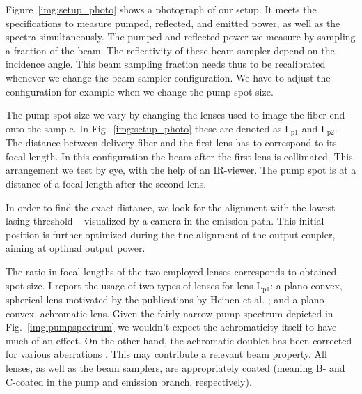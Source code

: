 Figure~\ref{img:setup_photo} shows a photograph of our setup.
It meets the specifications
to measure pumped,
reflected, and
emitted power,
as well as the spectra
simultaneously.
The pumped and reflected power
we measure by sampling
a fraction of the beam.
The reflectivity of these beam sampler
depend on the incidence angle.
This beam sampling fraction
needs thus to be recalibrated
whenever we change the beam sampler configuration.
We have to adjust the configuration
for example when we change
the pump spot size.

The pump spot size we vary
by changing the lenses
used to image the fiber end
onto the sample.
In Fig.~\ref{img:setup_photo}
these are denoted as
$\mathrm{L}_\mathrm{p1}$ and $\mathrm{L}_\mathrm{p2}$.
The distance between delivery fiber
and the first lens has to
correspond to its focal length.
In this configuration
the beam after the first lens is collimated.
This arrangement we test by eye,
with the help of an IR-viewer.
The pump spot is at
a distance of a focal length
after the second lens.

In order to find the exact distance,
we look for the alignment
with the lowest lasing threshold --
visualized by a camera
in the emission path.
This initial position
is further optimized
during the fine-alignment
of the output coupler,
aiming at optimal output power.
 
The ratio in focal lengths
of the two employed lenses
corresponds to obtained spot size.
I report the usage
of two types of lenses
for lens $\mathrm{L}_\mathrm{p1}$:
a plano-convex,
spherical lens
motivated by the publications
by Heinen et al. \cite{Heinen2012el,Heinen2012};
and a plano-convex, achromatic lens.
Given the fairly narrow pump spectrum
depicted in Fig.~\ref{img:pumpspectrum}
we wouldn't expect
the achromaticity itself
to have much of an effect.
On the other hand,
the achromatic doublet
has been corrected
for various aberrations \cite{ThorlabsAC}.
This may contribute
a relevant beam property.
All lenses,
as well as the beam samplers,
are appropriately coated
(meaning B- and C-coated
in the pump and emission branch,
respectively).

